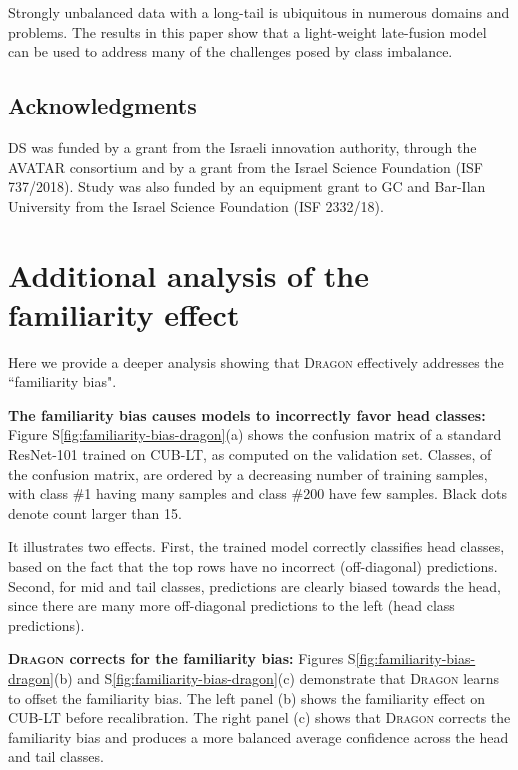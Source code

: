 \documentclass[10pt,twocolumn,letterpaper]{article}
\newcommand{\figref}[1]{Figure~\ref{#1}}
\newcommand{\DRAGON}{\textsc{Dragon}}
\begin{document}
Strongly unbalanced data with a long-tail is ubiquitous in numerous domains and problems. 
The results in this paper show that a light-weight late-fusion model can be used to address many of the challenges posed by class imbalance.
\subsection*{Acknowledgments}
 \noindent DS was funded by a grant from the Israeli innovation authority, through the AVATAR consortium and by a grant from the Israel Science Foundation (ISF 737/2018). Study was also funded by an equipment grant to GC and Bar-Ilan University from the Israel Science Foundation (ISF 2332/18).


\newpage
\clearpage
{\small


}
\clearpage


\renewcommand{\figurename}{Fig. S}
\renewcommand\tablename{Table S}
\renewcommand{\figref}[1]{Figure S\ref{#1}}
\newcommand{\tabref}[1]{Table S\ref{#1}}

\appendix

\section{Additional analysis of the familiarity effect}
\label{sec:extra-bias-effect}

Here we provide a deeper analysis showing that \DRAGON{} effectively addresses the ``familiarity bias". 

\textbf{The familiarity bias causes models to incorrectly favor head classes:} Figure S\ref{fig:familiarity-bias-dragon}(a) shows the confusion matrix of a standard ResNet-101 trained on CUB-LT, as computed on the validation set. Classes, of the confusion matrix, are ordered by a decreasing number of training samples, with class \#1 having many samples and class \#200 have few samples. Black dots denote count larger than 15. 

It illustrates two effects. First, the trained model correctly classifies head classes, based on the fact that the top rows have no incorrect (off-diagonal) predictions. Second, for mid and tail classes, predictions are clearly biased towards the head, since there are many more off-diagonal predictions to the left (head class predictions).

\textbf{\DRAGON{} corrects for the familiarity bias:} Figures S\ref{fig:familiarity-bias-dragon}(b) and S\ref{fig:familiarity-bias-dragon}(c) demonstrate that \DRAGON{} learns to offset the familiarity bias. 
The left panel (b) shows the familiarity effect on CUB-LT before recalibration.
The right panel (c) shows that \DRAGON{} corrects the familiarity bias and produces a more balanced average confidence across the head and tail classes.
\end{document}
